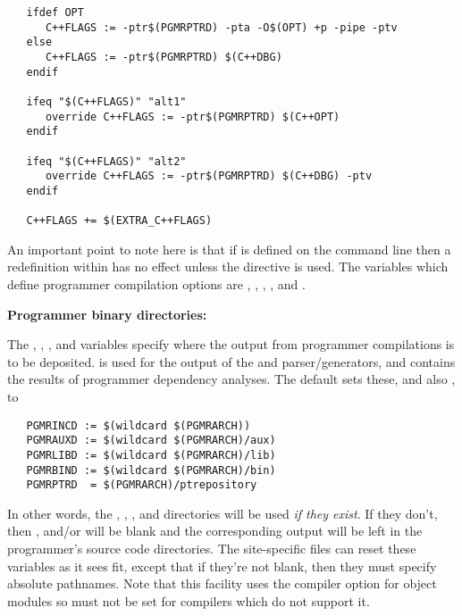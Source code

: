 \begin{verbatim}
   ifdef OPT
      C++FLAGS := -ptr$(PGMRPTRD) -pta -O$(OPT) +p -pipe -ptv
   else
      C++FLAGS := -ptr$(PGMRPTRD) $(C++DBG)
   endif

   ifeq "$(C++FLAGS)" "alt1"
      override C++FLAGS := -ptr$(PGMRPTRD) $(C++OPT)
   endif

   ifeq "$(C++FLAGS)" "alt2"
      override C++FLAGS := -ptr$(PGMRPTRD) $(C++DBG) -ptv
   endif

   C++FLAGS += $(EXTRA_C++FLAGS)
\end{verbatim}

\noindent
An important point to note here is that if  is defined on the
command line then a redefinition within  has no effect unless
the  directive is used.  The variables which define programmer
compilation options are , , ,
, and .

\textbf{Programmer binary directories:}

The , , , and 
variables specify where the output from programmer compilations is to be
deposited.   is used for the output of the  and
 parser/generators, and  contains the results of
programmer dependency analyses.  The default  sets these, and
also , to

\begin{verbatim}
   PGMRINCD := $(wildcard $(PGMRARCH))
   PGMRAUXD := $(wildcard $(PGMRARCH)/aux)
   PGMRLIBD := $(wildcard $(PGMRARCH)/lib)
   PGMRBIND := $(wildcard $(PGMRARCH)/bin)
   PGMRPTRD  = $(PGMRARCH)/ptrepository
\end{verbatim}

\noindent
In other words, the , ,
, and  directories will be used
{\em if they exist}.  If they don't, then , 
and/or  will be blank and the corresponding output will be
left in the programmer's source code directories.  The site-specific
 files can reset these variables as it sees fit, except that
if they're not blank, then they must specify absolute pathnames.  Note that
this facility uses the  compiler option for object modules so
 must not be set for compilers which do not support it.

